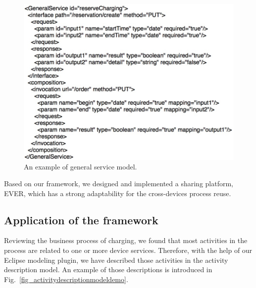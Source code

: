 \begin{figure}[!b]
\centering
\includegraphics[width=1.0\linewidth]{./graph/generalservicedemo}
\caption{An example of general service model.}
\label{fig_generalservicedemo}
\end{figure}

Based on our framework, we designed and implemented a sharing platform, EVER, which has a strong adaptability for the cross-devices process reuse. 

\subsection{Application of the framework}
Reviewing the business process of charging, we found that most activities in the process are related to one or more device services. Therefore, with the help of our Eclipse modeling plugin, we have described those activities in the activity description model. An example of those descriptions is introduced in Fig.~\ref{fig_activitydescriptionmodeldemo}. 

